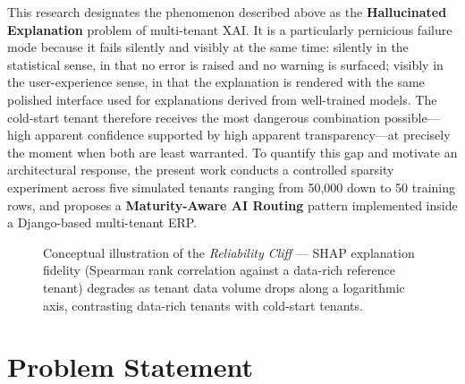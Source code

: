 This research designates the phenomenon described above as the \textbf{Hallucinated Explanation} problem of multi-tenant XAI. It is a particularly pernicious failure mode because it fails silently and visibly at the same time: silently in the statistical sense, in that no error is raised and no warning is surfaced; visibly in the user-experience sense, in that the explanation is rendered with the same polished interface used for explanations derived from well-trained models. The cold-start tenant therefore receives the most dangerous combination possible---high apparent confidence supported by high apparent transparency---at precisely the moment when both are least warranted. To quantify this gap and motivate an architectural response, the present work conducts a controlled sparsity experiment across five simulated tenants ranging from 50{,}000 down to 50 training rows, and proposes a \textbf{Maturity-Aware AI Routing} pattern implemented inside a Django-based multi-tenant ERP.

\begin{figure}[H]
  \centering
  \caption[Conceptual illustration of the Reliability Cliff in multi-tenant XAI.]%
  {Conceptual illustration of the \emph{Reliability Cliff} --- SHAP
   explanation fidelity (Spearman rank correlation against a data-rich
   reference tenant) degrades as tenant data volume drops along a
   logarithmic axis, contrasting data-rich tenants with cold-start
   tenants.}
  \label{fig:reliability_cliff}
\end{figure}

\section{Problem Statement}
\label{sec:problem_statement}

